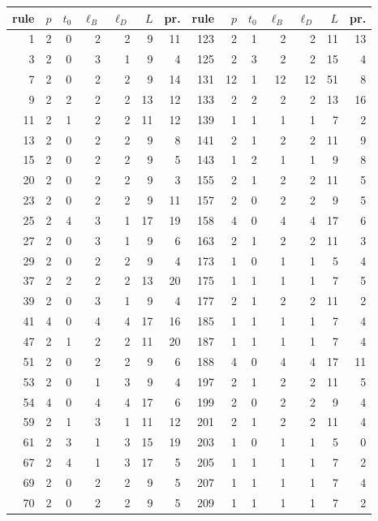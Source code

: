 \begin{tabular}{rrrrrrr|rrrrrrr}\toprule
rule & $p$ & $t_0$ & $\ell_B$ & $\ell_D$ & $L$ & pr. & rule & $p$ & $t_0$ & $\ell_B$ & $\ell_D$ & $L$ & pr.\\\midrule
1 & 2 & 0 & 2 & 2 & 9 & 11 & 123 & 2 & 1 & 2 & 2 & 11 & 13 \\
3 & 2 & 0 & 3 & 1 & 9 & 4 & 125 & 2 & 3 & 2 & 2 & 15 & 4 \\
7 & 2 & 0 & 2 & 2 & 9 & 14 & 131 & 12 & 1 & 12 & 12 & 51 & 8 \\
9 & 2 & 2 & 2 & 2 & 13 & 12 & 133 & 2 & 2 & 2 & 2 & 13 & 16 \\
11 & 2 & 1 & 2 & 2 & 11 & 12 & 139 & 1 & 1 & 1 & 1 & 7 & 2 \\
13 & 2 & 0 & 2 & 2 & 9 & 8 & 141 & 2 & 1 & 2 & 2 & 11 & 9 \\
15 & 2 & 0 & 2 & 2 & 9 & 5 & 143 & 1 & 2 & 1 & 1 & 9 & 8 \\
20 & 2 & 0 & 2 & 2 & 9 & 3 & 155 & 2 & 1 & 2 & 2 & 11 & 5 \\
23 & 2 & 0 & 2 & 2 & 9 & 11 & 157 & 2 & 0 & 2 & 2 & 9 & 5 \\
25 & 2 & 4 & 3 & 1 & 17 & 19 & 158 & 4 & 0 & 4 & 4 & 17 & 6 \\
27 & 2 & 0 & 3 & 1 & 9 & 6 & 163 & 2 & 1 & 2 & 2 & 11 & 3 \\
29 & 2 & 0 & 2 & 2 & 9 & 4 & 173 & 1 & 0 & 1 & 1 & 5 & 4 \\
37 & 2 & 2 & 2 & 2 & 13 & 20 & 175 & 1 & 1 & 1 & 1 & 7 & 5 \\
39 & 2 & 0 & 3 & 1 & 9 & 4 & 177 & 2 & 1 & 2 & 2 & 11 & 2 \\
41 & 4 & 0 & 4 & 4 & 17 & 16 & 185 & 1 & 1 & 1 & 1 & 7 & 4 \\
47 & 2 & 1 & 2 & 2 & 11 & 20 & 187 & 1 & 1 & 1 & 1 & 7 & 4 \\
51 & 2 & 0 & 2 & 2 & 9 & 6 & 188 & 4 & 0 & 4 & 4 & 17 & 11 \\
53 & 2 & 0 & 1 & 3 & 9 & 4 & 197 & 2 & 1 & 2 & 2 & 11 & 5 \\
54 & 4 & 0 & 4 & 4 & 17 & 6 & 199 & 2 & 0 & 2 & 2 & 9 & 4 \\
59 & 2 & 1 & 3 & 1 & 11 & 12 & 201 & 2 & 1 & 2 & 2 & 11 & 4 \\
61 & 2 & 3 & 1 & 3 & 15 & 19 & 203 & 1 & 0 & 1 & 1 & 5 & 0 \\
67 & 2 & 4 & 1 & 3 & 17 & 5 & 205 & 1 & 1 & 1 & 1 & 7 & 2 \\
69 & 2 & 0 & 2 & 2 & 9 & 5 & 207 & 1 & 1 & 1 & 1 & 7 & 4 \\
70 & 2 & 0 & 2 & 2 & 9 & 5 & 209 & 1 & 1 & 1 & 1 & 7 & 2 \\

\end{tabular}
